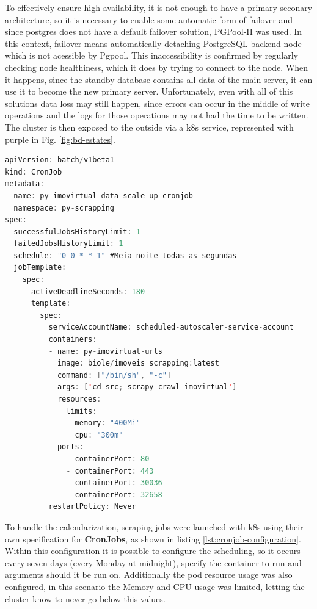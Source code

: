 To effectively ensure high availability, it is not enough to have a primary-seconary architecture, so it is necessary to enable some automatic form of failover and since postgres does not have a default failover solution, PGPool-II was used. In this context, failover means automatically detaching PostgreSQL backend node which is not acessible by Pgpool. This inaccessibility is confirmed by regularly checking node healthiness, which it does by trying to connect to the node. When it happens, since the standby database contains all data of the main server, it can use it to become the new primary server. Unfortunately, even with all of this solutions data loss may still happen, since errors can occur in the middle of write operations and the logs for those operations may not had the time to be written. The cluster is then exposed to the outside via a \acrshort{k8s} service, represented with purple in Fig. \ref{fig:bd-estates}.

\begin{lstlisting}[float, language=Java, caption={Cron job specification to launch the scrapping jobs}, captionpos=t, label={lst:cronjob-configuration}]
apiVersion: batch/v1beta1
kind: CronJob
metadata:
  name: py-imovirtual-data-scale-up-cronjob
  namespace: py-scrapping
spec:
  successfulJobsHistoryLimit: 1
  failedJobsHistoryLimit: 1
  schedule: "0 0 * * 1" #Meia noite todas as segundas
  jobTemplate:
    spec:
      activeDeadlineSeconds: 180
      template:
        spec:
          serviceAccountName: scheduled-autoscaler-service-account
          containers:
          - name: py-imovirtual-urls
            image: biole/imoveis_scrapping:latest
            command: ["/bin/sh", "-c"]
            args: ['cd src; scrapy crawl imovirtual']
            resources:
              limits:
                memory: "400Mi"
                cpu: "300m"
            ports:
              - containerPort: 80
              - containerPort: 443
              - containerPort: 30036 
              - containerPort: 32658
          restartPolicy: Never
\end{lstlisting}


To handle the calendarization, scraping jobs were launched with \acrshort{k8s} using their own specification for \textbf{CronJobs}, as shown in listing \ref{lst:cronjob-configuration}. Within this configuration it is possible to configure the scheduling, so it occurs every seven days (every Monday at midnight), specify the container to run and arguments should it be run on. Additionally the pod resource usage was also configured, in this scenario the Memory and CPU usage was limited, letting the cluster know to never go below this values.




